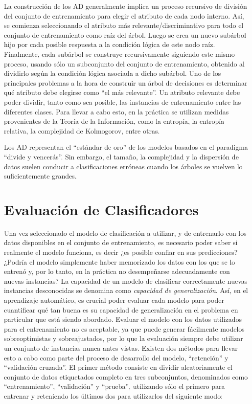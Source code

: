 La construcción de los \ac{AD} generalmente implica un proceso recursivo de división del conjunto de entrenamiento para elegir el atributo de cada nodo interno. Así, se comienza seleccionando el atributo más relevante/discriminativo para todo el conjunto de entrenamiento como raíz del árbol.
Luego se crea un nuevo subárbol hijo por cada posible respuesta a la condición lógica de este nodo raíz. Finalmente, cada subárbol se construye recursivamente siguiendo este mismo proceso, usando sólo un subconjunto del conjunto de entrenamiento, obtenido al dividirlo según la condición lógica asociada a dicho subárbol.
Uno de los principales problemas a la hora de construir un árbol de decisiones es determinar qué atributo debe elegirse como ``el más relevante''. Un atributo relevante debe poder dividir, tanto como sea posible, las instancias de entrenamiento entre las diferentes clases.
Para llevar a cabo esto, en la práctica se utilizan medidas provenientes de la Teoría de la Información\cite{shannon1948mathematical}, como la entropía, la entropía relativa, la complejidad de Kolmogorov, entre otras\cite{chandola2009anomaly}.

Los \ac{AD} representan el ``estándar de oro'' de los modelos basados en el paradigma ``divide y vencerás''. Sin embargo, el tamaño, la complejidad y la dispersión de datos suelen conducir a clasificaciones erróneas cuando los árboles se vuelven lo suficientemente grandes.



\section{Evaluación de Clasificadores}

Una vez seleccionado el modelo de clasificación a utilizar, y de entrenarlo con los datos disponibles en el conjunto de entrenamiento, es necesario poder saber si realmente el modelo funciona, es decir ¿es posible confiar en sus predicciones? ¿Podría el modelo simplemente haber memorizado los datos con los que se lo entrenó y, por lo tanto, en la práctica no desempeñarse adecuadamente con nuevas instancias?
La capacidad de un modelo de clasificar correctamente nuevas instancias desconocidas se denomina como \emph{capacidad de generalización}\cite{schmidhuber1997discovering,xu2017information}.
Así, en el aprendizaje automático, es crucial poder evaluar cada modelo para poder cuantificar qué tan buena es su capacidad de generalización en el problema en particular que está siendo abordado.
Evaluar el modelo con los datos utilizados para el entrenamiento no es aceptable, ya que puede generar fácilmente modelos sobreoptimistas y sobreajustados, por lo que la evaluación siempre debe utilizar un conjunto de instancias nunca antes vistas.
Existen dos métodos para llevar esto a cabo como parte del proceso de desarrollo del modelo, ``retención'' y ``validación cruzada''.
El primer método consiste en dividir aleatoriamente el conjunto de datos etiquetados completo en tres subconjuntos, denominados como ``entrenamiento'', ``validación'' y ``prueba'', utilizando sólo el primero para entrenar y reteniendo los últimos dos para utilizarlos del siguiente modo:

